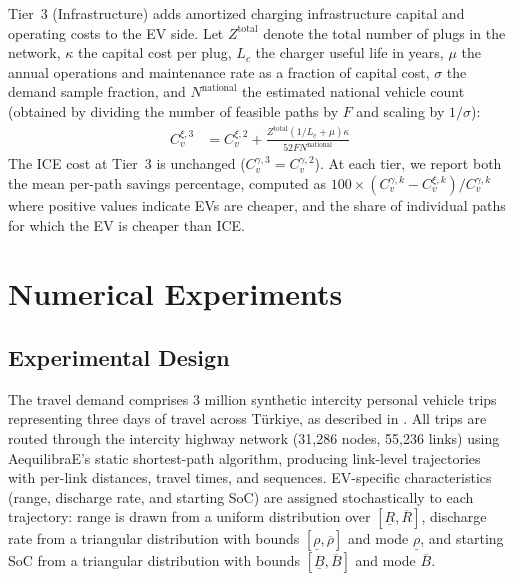 Tier~3 (Infrastructure) adds amortized charging infrastructure capital and operating costs to the EV side. Let $Z^{\text{total}}$ denote the total number of plugs in the network, $\kappa$ the capital cost per plug, $L_c$ the charger useful life in years, $\mu$ the annual operations and maintenance rate as a fraction of capital cost, $\sigma$ the demand sample fraction, and $N^{\text{national}}$ the estimated national vehicle count (obtained by dividing the number of feasible paths by $F$ and scaling by $1/\sigma$):
\begin{align}
    C_{v}^{\xi,3} &= C_{v}^{\xi,2} + \frac{ Z^{\text{total}} (1/L_c + \mu)\kappa}{52FN^{\text{national}}} \label{eq:t3ev}
\end{align}
The ICE cost at Tier~3 is unchanged ($C_{v}^{\gamma,3} = C_{v}^{\gamma,2}$). At each tier, we report both the mean per-path savings percentage, computed as $100 \times (C_{v}^{\gamma,k} - C_{v}^{\xi,k})/C_{v}^{\gamma,k}$ where positive values indicate EVs are cheaper, and the share of individual paths for which the EV is cheaper than ICE.

\section{Numerical Experiments}\label{sec:results}

\subsection{Experimental Design}\label{sec:design}

The travel demand comprises 3 million synthetic intercity personal vehicle trips representing three days of travel across T\"{u}rkiye, as described in . All trips are routed through the intercity highway network (31,286 nodes, 55,236 links) using AequilibraE's static shortest-path algorithm, producing link-level trajectories with per-link distances, travel times, and sequences. EV-specific characteristics (range, discharge rate, and starting SoC) are assigned stochastically to each trajectory: range is drawn from a uniform distribution over $[\underline{R}, \overline{R}]$, discharge rate from a triangular distribution with bounds $[\underline{\rho}, \overline{\rho}]$ and mode $\underline{\rho}$, and starting SoC from a triangular distribution with bounds $[\underline{B}, \overline{B}]$ and mode $\overline{B}$.

